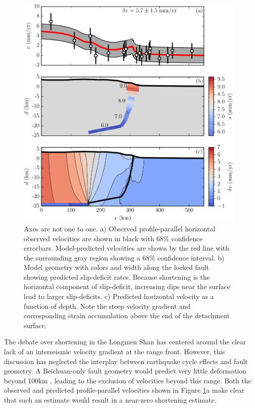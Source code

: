 \documentclass[12pt]{article}
\begin{document}
\begin{figure}[h!]
    \centering
    \includegraphics{figs/stack_figure_all_details.pdf}
    \caption{Axes are not one to one. a) Observed profile-parallel horizontal observed velocities are shown in black with 68\% confidence errorbars. Model-predicted velocities are shown by the red line with the surrounding gray region showing a 68\% confidence interval. b) Model geometry with colors and width along the locked fault showing predicted slip-deficit rates. Because shortening is the horizontal component of slip-deficit, increasing dips near the surface lead to larger slip-deficits. c) Predicted horizontal velocity as a function of depth. Note the steep velocity gradient and corresponding strain accumulation above the end of the detachment surface.}
    \label{fig:big_stack}
\end{figure}

The debate over shortening in the Longmen Shan has centered around the clear lack of an interseismic velocity gradient at the range front. However, this discussion has neglected the interplay between earthquake cycle effects and fault geometry. A Beichuan-only fault geometry would predict very little deformation beyond 100km \citep{savage83}, leading to the exclusion of velocities beyond this range. Both the observed and predicted profile-parallel velocities shown in Figure \ref{fig:big_stack}a make clear that such an estimate would result in a near-zero shortening estimate.
\end{document}
